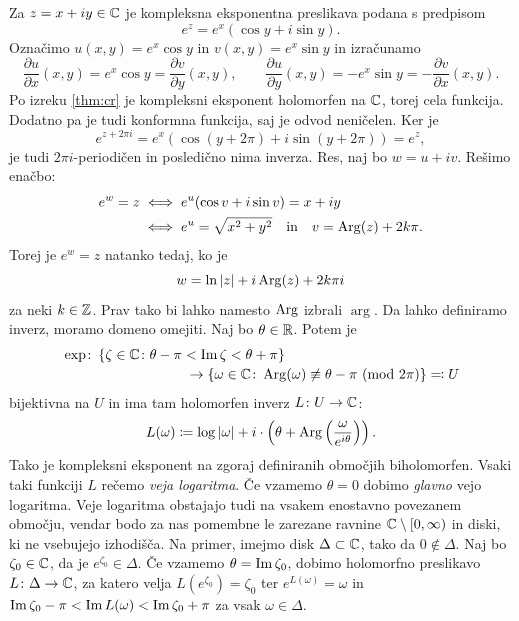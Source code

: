 \noindent Za \(z = x + i y \in \mathbb C\) je kompleksna eksponentna preslikava podana s predpisom
\[e^z = e^x (\cos y + i \sin y).\]
Označimo \(u (x, y) = e^x \cos y\) in \(v (x, y) = e^x \sin y\) in izračunamo
\[\frac{\partial u}{\partial x} (x, y) = e^x \cos y = \frac{\partial v}{\partial y} (x, y), \qquad \frac{\partial u}{\partial y} (x, y) = - e^x \sin y = -\frac{\partial v}{\partial x} (x, y).\]
Po izreku \ref{thm:cr} je kompleksni eksponent holomorfen na \(\mathbb C\), torej cela funkcija. Dodatno pa je tudi konformna funkcija, saj je odvod neničelen. Ker je
\[e^{z + 2 \pi i} = e^x (\cos (y + 2 \pi) + i \sin (y + 2 \pi)) = e^z,\]
je tudi \(2\pi i\)-periodičen in posledično nima inverza. Res, naj bo \(w = u + i v\). Rešimo enačbo:
\begin{align*}
    e^w = z & \iff e^u (\cos v + i \sin v) = x + i y                                    \\
            & \iff e^u = \sqrt{x^2 + y^2} \quad \text{in} \quad v = \operatorname{Arg} (z) + 2 k \pi.
\end{align*}
Torej je \(e^w = z\) natanko tedaj, ko je
\[w = \ln |z| + i \operatorname{Arg} (z) + 2 k \pi i\]
za neki \(k \in \mathbb Z\). Prav tako bi lahko namesto \(\operatorname{Arg}\) izbrali \(\arg\). Da lahko definiramo inverz, moramo domeno omejiti. Naj bo \(\theta \in \mathbb R\). Potem je
\[\begin{multlined}[10cm]
        \exp \colon  \set{\zeta \in \CC \colon \theta -\pi < \im \zeta < \theta + \pi}\\
        \to \set{\omega \in \CC \colon \Arg (\omega) \not\equiv \theta - \pi\ (\operatorname{mod}\, 2 \pi)} \eqcolon U
    \end{multlined}\]
bijektivna na \(U\) in ima tam holomorfen inverz \(L \colon U \to \mathbb C\):
\[L (\omega) \coloneq \log |\omega| + i \cdot \left( \theta + \operatorname{Arg} \left( \frac{\omega}{e^{i \theta}} \right) \right).\]
Tako je kompleksni eksponent na zgoraj definiranih območjih biholomorfen. Vsaki taki funkciji \(L\) rečemo \emph{veja logaritma}. Če vzamemo \(\theta = 0\) dobimo \emph{glavno} vejo logaritma. Veje logaritma obstajajo tudi na vsakem enostavno povezanem območju, vendar bodo za nas pomembne le zarezane ravnine \(\mathbb C \setminus [0, \infty)\) in diski, ki ne vsebujejo izhodišča. Na primer, imejmo disk \(\Delta \subset \mathbb C\), tako da \(0 \notin \Delta\). Naj bo \(\zeta_0 \in \mathbb C\), da je \(e^{\zeta_0} \in \Delta\). Če vzamemo \(\theta = \operatorname{Im} \zeta_0\), dobimo holomorfno preslikavo \(L \colon \Delta \to \mathbb C\), za katero velja \(L (e^{\zeta_0}) = \zeta_0\) ter \(e^{L (\omega)} = \omega\) in \(\operatorname{Im} \zeta_0 - \pi < \operatorname{Im} L (\omega) < \operatorname{Im} \zeta_0 + \pi\) za vsak \(\omega \in \Delta\).

